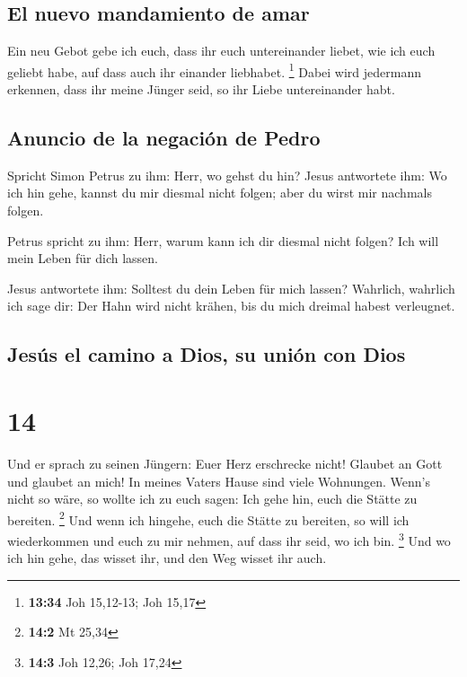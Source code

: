 \hypertarget{el-nuevo-mandamiento-de-amar}{%
\subsection{El nuevo mandamiento de
amar}\label{el-nuevo-mandamiento-de-amar}}

 Ein neu Gebot gebe ich euch, dass ihr euch untereinander
liebet, wie ich euch geliebt habe, auf dass auch ihr einander liebhabet.
\footnote{\textbf{13:34} Joh 15,12-13; Joh 15,17}  Dabei
wird jedermann erkennen, dass ihr meine Jünger seid, so ihr Liebe
untereinander habt.

\hypertarget{anuncio-de-la-negaciuxf3n-de-pedro}{%
\subsection{Anuncio de la negación de
Pedro}\label{anuncio-de-la-negaciuxf3n-de-pedro}}

 Spricht Simon Petrus zu ihm: Herr, wo gehst du hin?
Jesus antwortete ihm: Wo ich hin gehe, kannst du mir diesmal nicht
folgen; aber du wirst mir nachmals folgen.

 Petrus spricht zu ihm: Herr, warum kann ich dir diesmal
nicht folgen? Ich will mein Leben für dich lassen.

 Jesus antwortete ihm: Solltest du dein Leben für mich
lassen? Wahrlich, wahrlich ich sage dir: Der Hahn wird nicht krähen, bis
du mich dreimal habest verleugnet.

\hypertarget{jesuxfas-el-camino-a-dios-su-uniuxf3n-con-dios}{%
\subsection{Jesús el camino a Dios, su unión con
Dios}\label{jesuxfas-el-camino-a-dios-su-uniuxf3n-con-dios}}

\hypertarget{section-13}{%
\section{14}\label{section-13}}

 Und er sprach zu seinen Jüngern: Euer Herz erschrecke
nicht! Glaubet an Gott und glaubet an mich!  In meines
Vaters Hause sind viele Wohnungen. Wenn's nicht so wäre, so wollte ich
zu euch sagen: Ich gehe hin, euch die Stätte zu bereiten. \footnote{\textbf{14:2}
  Mt 25,34}  Und wenn ich hingehe, euch die Stätte zu
bereiten, so will ich wiederkommen und euch zu mir nehmen, auf dass ihr
seid, wo ich bin. \footnote{\textbf{14:3} Joh 12,26; Joh 17,24}
 Und wo ich hin gehe, das wisset ihr, und den Weg wisset
ihr auch.

